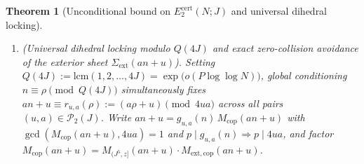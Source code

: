 \documentclass[11pt, a4paper]{article}
\theoremstyle{plain}
\newtheorem{theorem}{Theorem}[section]
\theoremstyle{definition}
\begin{document}
\begin{theorem}[Unconditional bound on $E_2^{\mathrm{cert}}(N;J)$ and universal dihedral locking]
\begin{enumerate}[label=(\alph*)]
\begin{enumerate}[label=(\roman*)]
        \item \emph{(Subcritical Plancherel multiplicity and Bohr-localized harmonic cones)}: 
        $|\Sigma_{\mathcal{I}_1}(an+u)|\le\varphi(4ua)^{\frac{\ell-1}{L_0}+\varepsilon}$ with $\ell\in\{1,\dots,\ell_{\mathrm{sub}}(\lambda)\}$, or $\chi\in\mathcal{B}_1(n;u,a)$ satisfies $\operatorname{ord}(\chi)\le(4J^{2})^{\varepsilon}$ or $1\le A_{r_1}(\chi)\le\operatorname{ord}(\chi)^{\varepsilon}$;
        
        \item \emph{(Quotient-certified escalation to State~II)}: 
        $\big|A(\overline{B}_{u,a}^{\mathrm{quot}}(n))\big|>\frac14 D_{u,a}$ in a quotient $G_{u,a}/\allowbreak K_{u,a}$ of order $D_{u,a}\le\exp(c_0(\lambda)\sqrt{\log\log N})$ with $K_{u,a}\le\operatorname{Stab}_{G_{u,a}}(\Sigma_{\mathcal{I}_1}(an+u))$ (Theorem~\ref{thm:quotient_container_polynomial_depth}(c)), where $an+u$ avoids the quotient-certified pullback $F_{u,a}(\allowbreak\overline{B}_{u,a}^{\mathrm{quot}}(n))\allowbreak\subseteq\allowbreak-\Sigma_{\mathcal{I}_1}(an+u)^{-1}$ of density $>1/4$ on $\mathcal{I}_2=(z_1,z]$ with strictly zero collisions ($R_{\mathrm{II}}=0$).
    \end{enumerate}
    Consequently, unconditionally for all $\lambda\in(1/3,1/2)$, the certified structured exceptional set $E_2^{\mathrm{cert}}(N;J)$ across all regimes (i)--(iv) satisfies:
    \begin{equation}\label{eq:unconditional_structured_bound}
    \begin{aligned}
    \big|E_2^{\mathrm{cert}}\big(N;(\log N)^{\lambda}\big)\big|\ &\ll\ N\exp\!\left(-\left(\frac{5(1-2\lambda)^{2}}{128\pi^{2}}+o(1)\right)(\log N)^{2\lambda}\log\log N\right)\\
    &\qquad\left(\text{and }\frac{5(1-2\lambda)^{2}}{32\pi^{2}}\ \text{on }E_2^{\mathrm{small}}(N;J)\right),
    \end{aligned}
    \end{equation}
    strictly surpassing Vaughan's $\exp(-c(\log N)^{2/3})$ bound for every\linebreak $\lambda\in(1/3,1/2)$, where $E_2^{\mathrm{small}}(N;J)$ denotes the small-sheet component in which at least $P/2$ pairs satisfy regime~(i).
    
    \item \emph{(Universal dihedral locking modulo $Q(4J)$ and exact zero-collision avoidance of the exterior sheet $\Sigma_{\mathrm{ext}}(an+u)$).} 
    Setting $Q(4J):=\mathrm{lcm}(1,2,\dots,4J)=\exp\big(o(P\log\log N)\big)$, global conditioning $n\equiv\rho\pmod{Q(4J)}$ simultaneously fixes $an+u\equiv r_{u,a}(\rho):=(a\rho+u)\pmod{4ua}$ across all pairs $(u,a)\in\mathcal{P}_2(J)$. Write $an+u=g_{u,a}(n)\,M_{\mathrm{cop}}(an+u)$ with $\gcd(M_{\mathrm{cop}}(an+u),4ua)=1$ and $p\mid g_{u,a}(n)\Rightarrow p\mid 4ua$, and factor $M_{\mathrm{cop}}(an+u)=M_{(J^{5},z]}(an+u)\cdot M_{\mathrm{ext,cop}}(an+u)$. 
    

\end{enumerate}
\end{theorem}
\end{document}
